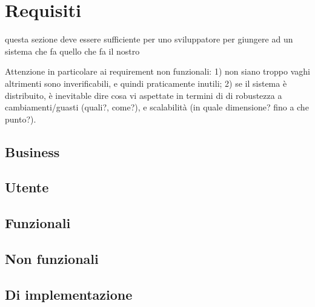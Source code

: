 \section{Requisiti}

questa sezione deve essere sufficiente per uno sviluppatore per giungere ad un sistema che fa quello che fa il nostro

Attenzione in particolare ai requirement non funzionali: 1) non siano troppo vaghi altrimenti sono inverificabili, e quindi praticamente inutili; 2) se il sistema è distribuito, è inevitable dire cosa vi aspettate in termini di di robustezza a cambiamenti/guasti (quali?, come?), e scalabilità (in quale dimensione? fino a che punto?).


\subsection{Business}
\subsection{Utente}
\subsection{Funzionali}
\subsection{Non funzionali}
\subsection{Di implementazione}

